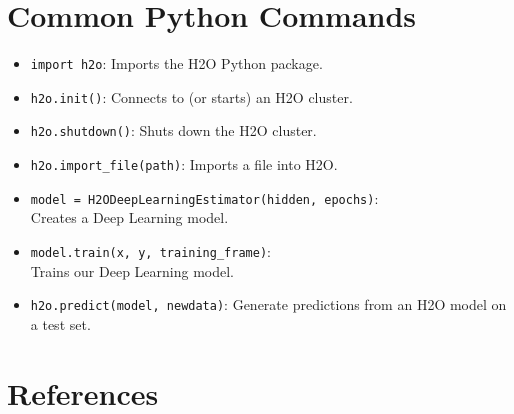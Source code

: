 {{{\begin{itemize}
\end{itemize}

\newpage
\section{Common Python Commands}
\begin{itemize}
\item \texttt{import h2o}:  Imports the H2O Python package.

\item \texttt{h2o.init()}:  Connects to (or starts) an H2O cluster.

\item \texttt{h2o.shutdown()}: Shuts down the H2O cluster.

\item \texttt{h2o.import\_file(path)}: Imports a file into H2O.

\item \texttt{model = H2ODeepLearningEstimator(hidden, epochs)}: \\ Creates a Deep Learning model.

\item \texttt{model.train(x, y, training\_frame)}: \\ Trains our Deep Learning model.


\item \texttt{h2o.predict(model, newdata)}: Generate predictions from an H2O model on a test set.

\end{itemize}

\newpage

\section{References}

  



}}}
